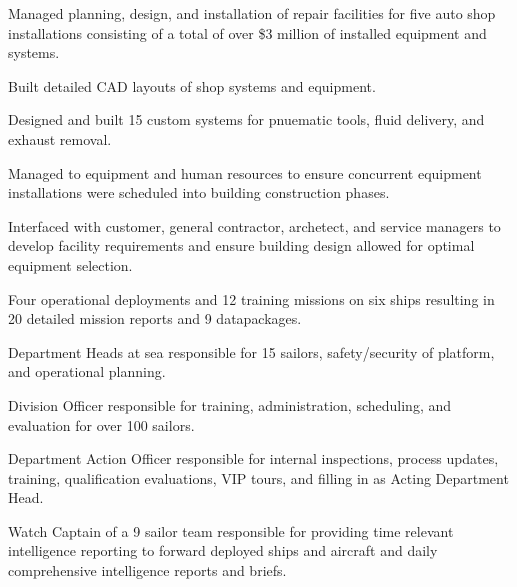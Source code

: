 \vspace{\topsep} %
\begin{tightemize}
\item Managed planning, design, and installation of repair facilities for five auto shop installations consisting of a total of over \$3 million of installed equipment and systems.
\item Built detailed CAD layouts of shop systems and equipment.
\item Designed and built 15 custom systems for pnuematic tools, fluid delivery, and exhaust removal.
\item Managed to equipment and human resources to ensure concurrent equipment installations were scheduled into building construction phases.
\item Interfaced with customer, general contractor, archetect, and service managers to develop facility requirements and ensure building design allowed for optimal equipment selection.
\end{tightemize}
\sectionsep

\begin{tightemize}
\item Four operational deployments and 12 training missions on six ships resulting in 20 detailed mission reports and 9 datapackages.
\item Department Heads at sea responsible for 15 sailors, safety/security of platform, and operational planning.
\item Division Officer responsible for training, administration, scheduling, and evaluation for over 100 sailors.
\item Department Action Officer responsible for internal inspections, process updates, training, qualification evaluations, VIP tours, and filling in as Acting Department Head.
\item Watch Captain of a 9 sailor team responsible for providing time relevant intelligence reporting to forward deployed ships and aircraft and daily comprehensive intelligence reports and briefs.
\end{tightemize}
\sectionsep
